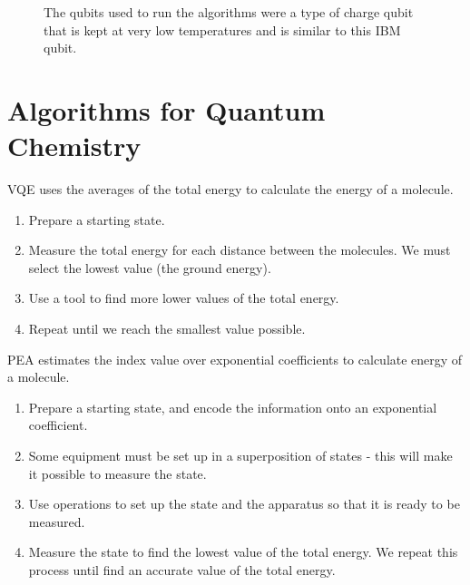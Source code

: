 \documentclass[14pt,landscape,color=UCLdarkred,margin=3cm]{uclposter}
\begin{document}
\begin{multicols}{3}
\begin{figure}[H]
\begin{center}
\begin{minipage}[c]{9em}
  \end{minipage}
  \qquad
  \begin{minipage}[c]{29em}
  \large

The qubits used to run the algorithms were a type of charge qubit that is kept at very low temperatures and is similar to this IBM qubit.

  \end{minipage}
  \end{center}

   
\end{figure}

\section*{Algorithms for Quantum Chemistry}

VQE uses the averages of the total energy to calculate the energy of a molecule.

\begin{highlightbox}
  \begin{enumerate}
\item Prepare a starting state. 
\item Measure the total energy for each distance between the molecules. We must select the lowest value (the ground energy).
\item Use a tool to find more lower values of the total energy.
\item Repeat until we reach the smallest value possible.
\end{enumerate}
\end{highlightbox}

PEA estimates the index value over exponential coefficients to calculate energy of a molecule.


\begin{highlightbox}
\begin{enumerate}
\item Prepare a starting state, and encode the information onto an exponential coefficient. 
\item Some equipment must be set up in a superposition of states - this will make it possible to measure the state.
\item Use operations to set up the state and the apparatus so that it is ready to be measured. 
\item Measure the state to find the lowest value of the total energy. We repeat this process until find an accurate value of the total energy.
\end{enumerate}
\end{highlightbox}



\end{multicols}
\end{document}
